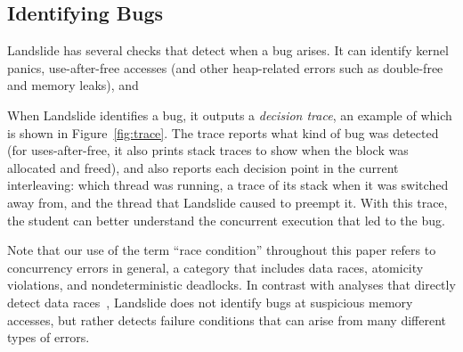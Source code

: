 \subsection{Identifying Bugs}

Landslide has several checks that detect when a bug arises. It can identify kernel panics, use-after-free accesses (and other heap-related errors such as double-free and memory leaks), and

When Landslide identifies a bug, it outputs a {\em decision trace}, an example of which is shown in Figure~\ref{fig:trace}.
The trace reports what kind of bug was detected (for uses-after-free, it also prints stack traces to show when the block was allocated and freed), and also reports each decision point in the current interleaving: which thread was running, a trace of its stack when it was switched away from, and the thread that Landslide caused to preempt it.
With this trace, the student can better understand the concurrent execution that led to the bug.

Note that our use of the term ``race condition'' throughout this paper refers to concurrency errors in general, a category that includes data races, atomicity violations, and nondeterministic deadlocks.
In contrast with analyses that directly detect data races~\cite{tsan}, Landslide does not identify bugs at suspicious memory accesses, but rather detects failure conditions that can arise from many different types of errors.

